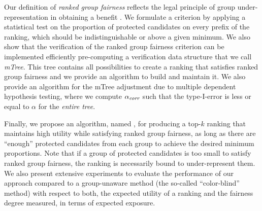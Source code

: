 Our definition of \emph{ranked group fairness} reflects the legal principle of group under-representation in obtaining a benefit \cite{ellis2012eu,lerner2003group}.
%
%
%
We formulate a criterion by applying a statistical test on the proportion of protected candidates on every prefix of the ranking, which should be indistinguishable or above a given minimum.
%
%
We also show that the verification of the ranked group fairness criterion can be implemented efficiently   pre-computing a verification data structure that we call \emph{mTree}.
%
This tree contains all possibilities to create a ranking that satisfies ranked group fairness and we provide an algorithm to build and maintain it.
%
We also provide an algorithm \algoCorrect for the mTree adjustment due to multiple dependent hypothesis testing, where we compute $\alpha_\textit{corr}$ such that the type-I-error is less or equal to $\alpha$ for the \emph{entire tree}.
%

Finally, we propose an  algorithm, named \algoFAIR, for producing a top-$k$ ranking that maintains high utility while satisfying ranked group fairness, as long as there are ``enough'' protected candidates from each group to achieve the desired minimum proportions.
%
Note that if a group of protected candidates is too small to satisfy ranked group fairness, the ranking is necessarily bound to under-represent them. 
%
We also present extensive experiments to evaluate the performance of our approach compared to a group-unaware method (the so-called ``color-blind'' method) with respect to both, the expected utility of a ranking and the fairness degree measured, in terms of expected exposure.

